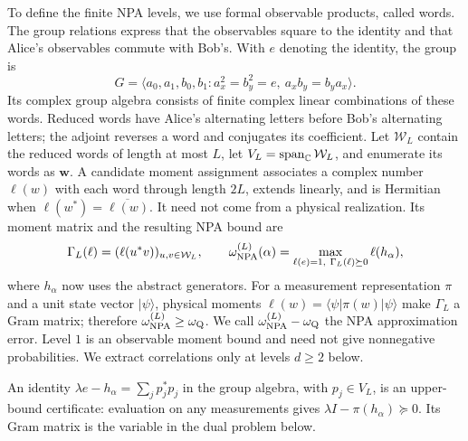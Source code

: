 \documentclass[11pt]{article}
\theoremstyle{remark}\newtheorem{remark}[theorem]{Remark}
\newcommand{\Span}{\operatorname{span}}\newcommand{\Newt}{\operatorname{Newt}}
\begin{document}
To define the finite NPA levels, we use formal observable products, called
words. The group relations express that the observables square to the
identity and that Alice's observables commute with Bob's. With $e$ denoting
the identity, the group is
\begin{equation}
G=\langle a_0,a_1,b_0,b_1:a_x^2=b_y^2=e,\ a_xb_y=b_ya_x\rangle.
\label{supp:eq:group-presentation}
\end{equation}
Its complex group algebra consists of finite complex linear combinations
of these words. Reduced words have Alice's alternating letters before Bob's
alternating letters; the adjoint reverses a word and conjugates its coefficient. Let
$\mathcal W_L$ contain the reduced words of length at most $L$, let
$V_L=\Span_\C\mathcal W_L$, and enumerate its words as $\bm w$.
A candidate moment assignment associates a complex number $\ell(w)$ with
each word through length $2L$, extends linearly, and is Hermitian when
$\ell(w^*)=\overline{\ell(w)}$. It need not come from a physical realization.
Its moment matrix and the resulting NPA bound are
\begin{equation}
\Gamma_L(\ell)=(\ell(u^*v))_{u,v\in\mathcal W_L},\qquad
\omega_{\rm NPA}^{(L)}(\alpha)
=\max_{\ell(e)=1,\ \Gamma_L(\ell)\succeq0}\ell(h_\alpha),
\label{supp:eq:primal-NPA}
\end{equation}
where $h_\alpha$ now uses the abstract generators. For a measurement
representation $\pi$ and a unit state vector $|\psi\rangle$, physical moments
$\ell(w)=\langle\psi|\pi(w)|\psi\rangle$ make $\Gamma_L$ a Gram matrix;
therefore $\omega_{\rm NPA}^{(L)}\geq\omega_{\rm Q}$.
We call $\omega_{\rm NPA}^{(L)}-\omega_{\rm Q}$ the NPA approximation error.
Level $1$ is an observable moment bound and need not give nonnegative
probabilities. We extract correlations only at levels $d\geq2$ below.

An identity $\lambda e-h_\alpha=\sum_jp_j^*p_j$ in the group algebra,
with $p_j\in V_L$, is an upper-bound certificate: evaluation on any
measurements gives $\lambda I-\pi(h_\alpha)\succeq0$. Its Gram matrix is the
variable in the dual problem below.
\end{document}
